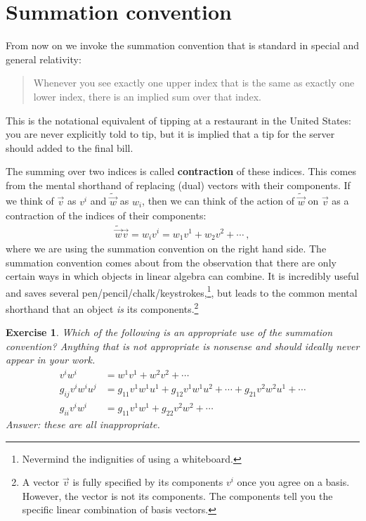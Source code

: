 \documentclass[
  11pt,
	colorful,
	raggedright,
]{tufte-style-thesis-flip}
\newtheorem{exercise}{Exercise}[section]
\begin{document}
\section{Summation convention}

From now on we invoke the summation convention that is standard in special and general relativity:
\begin{quote}
Whenever you see exactly one upper index that is the same as exactly one lower index, there is an implied sum over that index.
\end{quote}
This is the notational equivalent of tipping at a restaurant in the United States: you are never explicitly told to tip, but it is implied that a tip for the server should added to the final bill.

The summing over two indices is called \textbf{contraction} of these indices. This comes from the mental shorthand of replacing (dual) vectors with their components. If we think of $\vec{v}$ as $v^i$ and $\tilde{\vec{w}}$ as $w_i$, then we can think of the action of $\tilde{\vec w}$ on $\vec v$ as a contraction of the indices of their components:
\begin{align}
  \tilde{\vec w}\vec{v} = w_i v^i = w_1v^1 + w_2v^2 + \cdots \ ,
\end{align}
where we are using the summation convention on the right hand side.
%
The summation convention comes about from the observation that there are only certain ways in which objects in linear algebra can combine. It is incredibly useful and saves several pen/pencil/chalk/keystrokes,\footnote{Nevermind the indignities of using a whiteboard.}, but leads to the common mental shorthand that an object \emph{is} its components.\footnote{A vector $\vec{v}$ is fully specified by its components $v^i$ once you agree on a basis. However, the vector is not its components. The components tell you the specific linear combination of basis vectors.}

\begin{exercise}
Which of the following is an appropriate use of the summation convention? Anything that is not appropriate is nonsense and should ideally never appear in your work.
\begin{align}
  v^i w^i &= w^1 v^1 + w^2 v^2 + \cdots
  \\
  g_{ij}v^iw^i u^j &= g_{11}v^1w^1u^1 + g_{12}v^1w^1u^2 + \cdots  + g_{21}v^2w^2u^1 + \cdots \\
  g_{ii}v^iw^i &= g_{11}v^1w^1 + g_{22}v^2w^2 + \cdots 
\end{align}
Answer: these are all inappropriate. 
\end{exercise}
\end{document}
